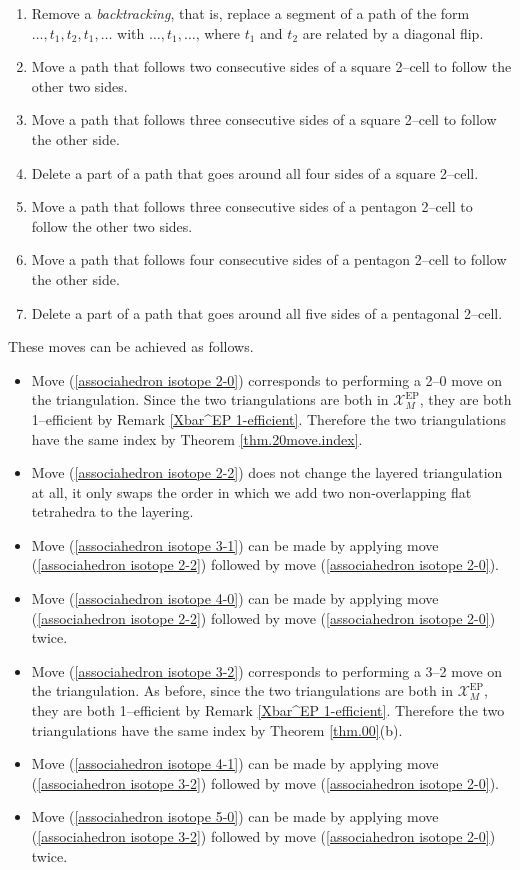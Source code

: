 \documentclass[12pt]{amsart}
\theoremstyle{definition}
\theoremstyle{remark}
\def\calX{\mathcal X}
\def\EP{\mathrm{EP}}
\begin{document}
\begin{enumerate}
\item Remove a \emph{backtracking}, that is, replace a segment of a path of the form $\ldots,t_1, t_2, t_1,\ldots$ with $\ldots, t_1, \ldots$, where $t_1$ and $t_2$ are related by a diagonal flip. \label{associahedron isotope 2-0}
\item Move a path that follows two consecutive sides of a square 2--cell to follow the other two sides. \label{associahedron isotope 2-2}
\item Move a path that follows three consecutive sides of a square 2--cell to follow the other side. \label{associahedron isotope 3-1}
\item Delete a part of a path that goes around all four sides of a square 2--cell. \label{associahedron isotope 4-0}
\item Move a path that follows three consecutive sides of a pentagon 2--cell to follow the other two sides. \label{associahedron isotope 3-2}
\item Move a path that follows four consecutive sides of a pentagon 2--cell to follow the other side. \label{associahedron isotope 4-1}
\item Delete a part of a path that goes around all five sides of a pentagonal 2--cell. \label{associahedron isotope 5-0}
\end{enumerate}

These moves can be achieved as follows.
\begin{itemize}
\item Move (\ref{associahedron isotope 2-0}) corresponds to performing a 2--0 move on the triangulation. Since the two triangulations are both in $\calX_M^{\EP}$, they are both 1--efficient by Remark \ref{Xbar^EP 1-efficient}. Therefore the two triangulations have the same index by Theorem \ref{thm.20move.index}.
\item Move (\ref{associahedron isotope 2-2}) does not change the layered triangulation at all, it only swaps the order in which we add two non-overlapping flat tetrahedra to the layering.
\item Move (\ref{associahedron isotope 3-1}) can be made by applying move (\ref{associahedron isotope 2-2}) followed by move (\ref{associahedron isotope 2-0}).
\item Move (\ref{associahedron isotope 4-0}) can be made by applying move (\ref{associahedron isotope 2-2}) followed by move (\ref{associahedron isotope 2-0}) twice.
\item Move (\ref{associahedron isotope 3-2}) corresponds to performing a 3--2 move on the triangulation. As before, since the two triangulations are both in $\calX_M^{\EP}$, they are both 1--efficient by Remark \ref{Xbar^EP 1-efficient}. Therefore the two triangulations have the same index by Theorem \ref{thm.00}(b).
\item Move (\ref{associahedron isotope 4-1}) can be made by applying move (\ref{associahedron isotope 3-2}) followed by move (\ref{associahedron isotope 2-0}).
\item Move (\ref{associahedron isotope 5-0}) can be made by applying move (\ref{associahedron isotope 3-2}) followed by move (\ref{associahedron isotope 2-0}) twice.
\end{itemize}
\end{document}
